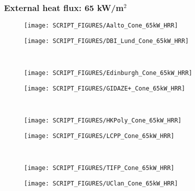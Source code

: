 \begin{landscape}
\subsubsection{External heat flux: 65 kW/m$^2$}
\begin{minipage}{0.65\textwidth}
\begin{figure}[H]
{\texttt{[image: SCRIPT\_FIGURES/Aalto\_Cone\_65kW\_HRR]}}\\
\end{figure}
\end{minipage}
\begin{minipage}{0.35\textwidth}
\begin{figure}[H]
{\texttt{[image: SCRIPT\_FIGURES/DBI\_Lund\_Cone\_65kW\_HRR]}}\\
\end{figure}
\end{minipage}\\
\begin{minipage}{0.65\textwidth}
\begin{figure}[H]
{\texttt{[image: SCRIPT\_FIGURES/Edinburgh\_Cone\_65kW\_HRR]}}\\
\end{figure}
\end{minipage}
\begin{minipage}{0.35\textwidth}
\begin{figure}[H]
{\texttt{[image: SCRIPT\_FIGURES/GIDAZE+\_Cone\_65kW\_HRR]}}\\
\end{figure}
\end{minipage}\\
\vfill 

\begin{minipage}{0.65\textwidth}
\begin{figure}[H]
{\texttt{[image: SCRIPT\_FIGURES/HKPoly\_Cone\_65kW\_HRR]}}\\
\end{figure}
\end{minipage}
\begin{minipage}{0.35\textwidth}
\begin{figure}[H]
{\texttt{[image: SCRIPT\_FIGURES/LCPP\_Cone\_65kW\_HRR]}}\\
\end{figure}
\end{minipage}\\
\begin{minipage}{0.65\textwidth}
\begin{figure}[H]
{\texttt{[image: SCRIPT\_FIGURES/TIFP\_Cone\_65kW\_HRR]}}\\
\end{figure}
\end{minipage}
\begin{minipage}{0.35\textwidth}
\begin{figure}[H]
{\texttt{[image: SCRIPT\_FIGURES/UClan\_Cone\_65kW\_HRR]}}\\
\end{figure}
\end{minipage}\\
\vfill 


\end{landscape}
